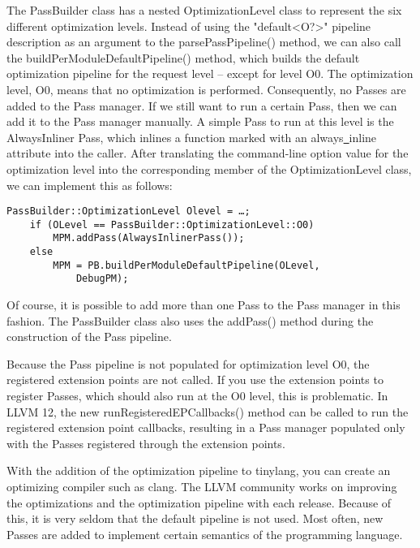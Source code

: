 \begin{enumerate}
The PassBuilder class has a nested OptimizationLevel class to represent the six different optimization levels. Instead of using the "default<O?>" pipeline description as an argument to the parsePassPipeline() method, we can also call the buildPerModuleDefaultPipeline() method, which builds the default optimization pipeline for the request level – except for level O0. The optimization level, O0, means that no optimization is performed. Consequently, no Passes are added to the Pass manager. If we still want to run a certain Pass, then we can add it to the Pass manager manually. A simple Pass to run at this level is the AlwaysInliner Pass, which inlines a function marked with an always\underline{~}inline attribute into the caller. After translating the command-line option value for the optimization level into the corresponding member of the OptimizationLevel class, we can implement this as follows:
\begin{lstlisting}[caption={}]
	PassBuilder::OptimizationLevel Olevel = …;
	if (OLevel == PassBuilder::OptimizationLevel::O0)
		MPM.addPass(AlwaysInlinerPass());
	else
		MPM = PB.buildPerModuleDefaultPipeline(OLevel, 
			DebugPM);
\end{lstlisting}

Of course, it is possible to add more than one Pass to the Pass manager in this fashion. The PassBuilder class also uses the addPass() method during the construction of the Pass pipeline.\par

\begin{tcolorbox}[colback=blue!5!white,colframe=mymauve!75!black, title=New functionality in LLVM 12 – running extension point callbacks]
Because the Pass pipeline is not populated for optimization level O0, the registered extension points are not called. If you use the extension points to register Passes, which should also run at the O0 level, this is problematic. In LLVM 12, the new runRegisteredEPCallbacks() method can be called to run the registered extension point callbacks, resulting in a Pass manager populated only with the Passes registered through the extension points.
\end{tcolorbox}

\end{enumerate}

With the addition of the optimization pipeline to tinylang, you can create an optimizing compiler such as clang. The LLVM community works on improving the optimizations and the optimization pipeline with each release. Because of this, it is very seldom that the default pipeline is not used. Most often, new Passes are added to implement certain semantics of the programming language.\par




